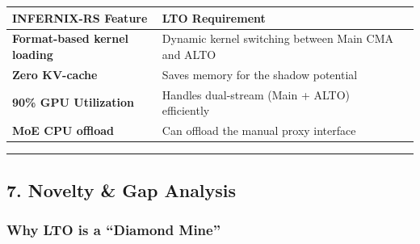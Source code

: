 \documentclass[
  11pt,
  a4paper,
]{article}
\begin{document}
\begin{longtable}[]{@{}
  >{\raggedright\arraybackslash}p{}
  >{\raggedright\arraybackslash}p{}
  >{\raggedright\arraybackslash}p{}@{}}
\toprule\noalign{}
\begin{minipage}[b]{\linewidth}\raggedright
INFERNIX-RS Feature
\end{minipage} & \begin{minipage}[b]{\linewidth}\raggedright
LTO Requirement
\end{minipage} & \begin{minipage}[b]{\linewidth}\raggedright
\end{minipage} \\
\midrule\noalign{}
\endhead
\bottomrule\noalign{}
\endlastfoot
\textbf{Format-based kernel loading} & Dynamic kernel switching between
Main CMA and ALTO & \\
\textbf{Zero KV-cache} & Saves memory for the shadow potential & \\
\textbf{90\% GPU Utilization} & Handles dual-stream (Main + ALTO)
efficiently & \\
\textbf{MoE CPU offload} & Can offload the manual proxy interface & \\
\end{longtable}

\begin{center}\rule{0.5\linewidth}{0.5pt}\end{center}

\subsection{7. Novelty \& Gap Analysis}\label{novelty-gap-analysis}

\subsubsection{Why LTO is a ``Diamond
Mine''}\label{why-lto-is-a-diamond-mine}
\end{document}
